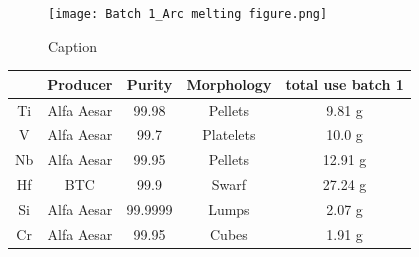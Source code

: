 \documentclass[a4]{article}
\begin{document}
\begin{figure}
    \centering
    \texttt{[image: Batch 1\_Arc melting figure.png]}
    \caption{Caption}
    \label{fig:arc-melted samples}
\end{figure}

\begin{tabular}{ccccc}
\toprule
{} &    Producer &   Purity & Morphology & total use batch 1 \\
\midrule
Ti &  Alfa Aesar &    99.98 &    Pellets &            9.81  g \\
V  &  Alfa Aesar &     99.7 &  Platelets &            10.0 g \\
Nb &  Alfa Aesar &    99.95 &    Pellets &           12.91 g \\
Hf &         BTC &     99.9 &      Swarf &           27.24 g \\
Si &  Alfa Aesar &  99.9999 &      Lumps &            2.07 g \\
Cr &  Alfa Aesar &    99.95 &      Cubes &            1.91 g \\
\bottomrule
\end{tabular}
\end{document}
